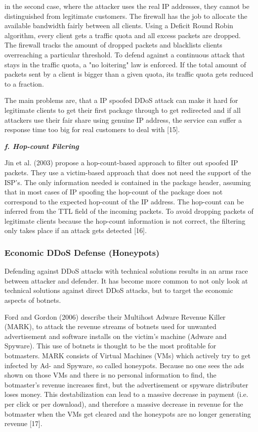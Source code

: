 in the second case, where the attacker uses the real IP addresses, they cannot be distinguished from legitimate customers. The firewall has the job to allocate the available bandwidth fairly between all clients. Using a Deficit Round Robin algorithm, every client gets a traffic quota and all excess packets are dropped. The firewall tracks the amount of dropped packets and blacklists clients overreaching a particular threshold. To defend against a continuous attack that stays in the traffic quota, a "no loitering" law is enforced. If the total amount of packets sent by a client is bigger than a given quota, its traffic quota gets reduced to a fraction.

The main problems are, that a IP spoofed DDoS attack can make it hard for legitimate clients to get their first package through to get redirected and if all attackers use their fair share using genuine IP address, the service can suffer a response time too big for real customers to deal with [15].

\textbf{\textit{f. Hop-count Filering}}

Jin et al. (2003) propose a hop-count-based approach to filter out spoofed IP packets. They use a victim-based approach that does not need the support of the ISP's. The only information needed is contained in the package header, assuming that in most cases of IP spoofing the hop-count of the package does not correspond to the expected hop-count of the IP address. The hop-count can be inferred from the TTL field of the incoming packets. To avoid dropping packets of legitimate clients because the hop-count information is not correct, the filtering only takes place if an attack gets detected [16]. 

		\subsubsection{Economic DDoS Defense (Honeypots)}
Defending against DDoS attacks with technical solutions results in an arms race between attacker and defender. It has become more common to not only look at technical solutions against direct DDoS attacks, but to target the economic aspects of botnets.

Ford and Gordon (2006) describe their Multihost Adware Revenue Killer (MARK), to attack the revenue streams of botnets used for unwanted advertisement and software installs on the victim's machine (Adware and Spyware). This use of botnets is thought to be the most profitable for botmasters. MARK consists of Virtual Machines (VMs) which actively try to get infected by Ad- and Spyware, so called honeypots. Because no one sees the ads shown on those VMs and there is no personal information to find, the botmaster's revenue increases first, but the advertisement or spyware distributer loses money. This destabilization can lead to a massive decrease in payment (i.e. per click or per download), and therefore a massive decrease in revenue for the botmaster when the VMs get cleared and the honeypots are no longer generating revenue [17].

